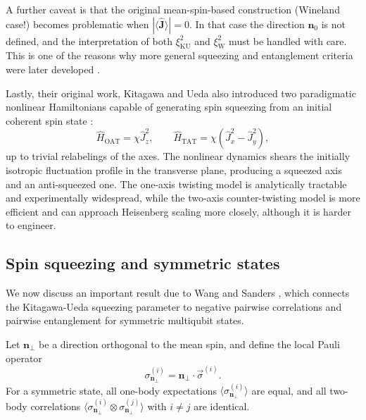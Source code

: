 A further caveat is that the original mean-spin-based construction (Wineland case!) becomes problematic when \( |\langle \hat{\mathbf{J}}\rangle|=0 \). In that case the direction \(\mathbf{n}_0\) is not defined, and the interpretation of both \(\xi_{\mathrm{KU}}^2\) and \(\xi_{\mathrm{W}}^2\) must be handled with care. This is one of the reasons why more general squeezing and entanglement criteria were later developed \cite{Ma11, SorMol00}.

Lastly, their original work, Kitagawa and Ueda also introduced two paradigmatic nonlinear Hamiltonians capable of generating spin squeezing from an initial coherent spin state \cite{KitagawaUeda93}:
\begin{equation}
	\hat H_{\mathrm{OAT}}=\chi \hat J_z^2,
	\qquad
	\hat H_{\mathrm{TAT}}=\chi(\hat J_x^2-\hat J_y^2),
	\label{eq:intro_qm_oat_tat_hamiltonians}
\end{equation}
up to trivial relabelings of the axes. The nonlinear dynamics shears the initially isotropic fluctuation profile in the transverse plane, producing a squeezed axis and an anti-squeezed one. The one-axis twisting model is analytically tractable and experimentally widespread, while the two-axis counter-twisting model is more efficient and can approach Heisenberg scaling more closely, although it is harder to engineer.

\subsection{Spin squeezing and symmetric states}

We now discuss an important result due to Wang and Sanders \cite{WangSanders03}, which connects the Kitagawa-Ueda squeezing parameter to negative pairwise correlations and pairwise entanglement for symmetric multiqubit states.

Let \(\mathbf{n}_\perp\) be a direction orthogonal to the mean spin, and define the local Pauli operator
\begin{equation}
	\sigma_{\mathbf{n}_\perp}^{(i)}
	=
	\mathbf{n}_\perp\cdot \vec \sigma^{(i)}.
	\label{eq:intro_qm_local_pauli_transverse_direction}
\end{equation}
For a symmetric state, all one-body expectations \(\langle \sigma_{\mathbf{n}_\perp}^{(i)}\rangle\) are equal, and all two-body correlations \(\langle \sigma_{\mathbf{n}_\perp}^{(i)}\otimes \sigma_{\mathbf{n}_\perp}^{(j)}\rangle\) with \(i\neq j\) are identical.

